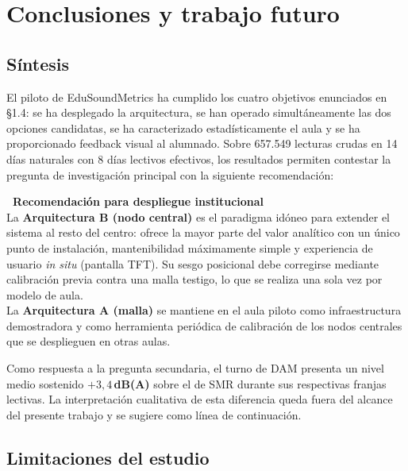 \documentclass[11pt,a4paper,openany]{report}
\begin{document}
\chapter{Conclusiones y trabajo futuro}

\section{S\'intesis}

El piloto de EduSoundMetrics ha cumplido los cuatro objetivos enunciados en \S 1.4: se ha desplegado la arquitectura, se han operado simult\'aneamente las dos opciones candidatas, se ha caracterizado estad\'isticamente el aula y se ha proporcionado feedback visual al alumnado. Sobre 657.549 lecturas crudas en 14 d\'ias naturales con 8 d\'ias lectivos efectivos, los resultados permiten contestar la pregunta de investigaci\'on principal con la siguiente recomendaci\'on:

\begin{KeyFinding}
\textbf{\faTrophy\ Recomendaci\'on para despliegue institucional}\\[0.3em]
La \textbf{Arquitectura B (nodo central)} es el paradigma id\'oneo para extender el sistema al resto del centro: ofrece la mayor parte del valor anal\'itico con un \'unico punto de instalaci\'on, mantenibilidad m\'aximamente simple y experiencia de usuario \emph{in situ} (pantalla TFT). Su sesgo posicional debe corregirse mediante calibraci\'on previa contra una malla testigo, lo que se realiza una sola vez por modelo de aula.\\[0.3em]
La \textbf{Arquitectura A (malla)} se mantiene en el aula piloto como infraestructura demostradora y como herramienta peri\'odica de calibraci\'on de los nodos centrales que se desplieguen en otras aulas.
\end{KeyFinding}

Como respuesta a la pregunta secundaria, el turno de DAM presenta un nivel medio sostenido \textbf{$+3{,}4$\,dB(A)} sobre el de SMR durante sus respectivas franjas lectivas. La interpretaci\'on cualitativa de esta diferencia queda fuera del alcance del presente trabajo y se sugiere como l\'inea de continuaci\'on.

\section{Limitaciones del estudio}
\end{document}
